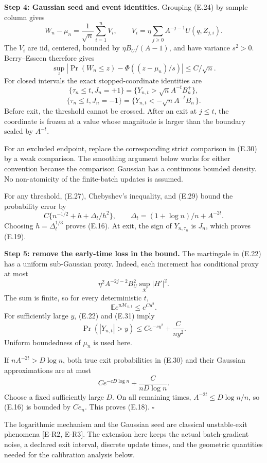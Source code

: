 \textbf{Step 4: Gaussian seed and event identities.} Grouping (E.24) by
sample column gives \[
W_n-\mu_n=\frac1{\sqrt n}\sum_{i=1}^n V_i,\qquad
V_i=\eta\sum_{j\ge0}A^{-j-1}U(q,Z_{j,i}).
\tag{E.28}
\] The \(V_i\) are iid, centered, bounded by \(\eta B_U/(A-1)\), and
have variance \(s^2>0\). Berry--Esseen therefore gives \[
\sup_z\left|
\Pr(W_n\le z)-\Phi((z-\mu_n)/s)
\right|\le C/\sqrt n.
\tag{E.29}
\] For closed intervals the exact stopped-coordinate identities are \[
\{\tau_n\le t,J_n=+1\}
=\{Y_{n,t}>\sqrt n A^{-t}B_n^+\},
\] \[
\{\tau_n\le t,J_n=-1\}
=\{Y_{n,t}<-\sqrt n A^{-t}B_n^-\}.
\tag{E.30}
\] Before exit, the threshold cannot be crossed. After an exit at
\(j\le t\), the coordinate is frozen at a value whose magnitude is
larger than the boundary scaled by \(A^{-t}\).

For an excluded endpoint, replace the corresponding strict comparison in
(E.30) by a weak comparison. The smoothing argument below works for
either convention because the comparison Gaussian has a continuous
bounded density. No non-atomicity of the finite-batch updates is
assumed.

For any threshold, (E.27), Chebyshev's inequality, and (E.29) bound the
probability error by \[
C\{n^{-1/2}+h+\Delta_t/h^2\},\qquad
\Delta_t=(1+\log n)/n+A^{-2t}.
\] Choosing \(h=\Delta_t^{1/3}\) proves (E.16). At exit, the sign of
\(Y_{n,\tau_n}\) is \(J_n\), which proves (E.19).

\textbf{Step 5: remove the early-time loss in the bound.} The martingale
in (E.22) has a uniform sub-Gaussian proxy. Indeed, each increment has
conditional proxy at most \[
\eta^2 A^{-2j-2}B_U^2\sup_{\mathcal K}|H'|^2.
\] The sum is finite, so for every deterministic \(t\), \[
\mathbb E e^{u\mathcal M_{n,t}}\le e^{C u^2}.
\tag{E.31}
\] For sufficiently large \(y\), (E.22) and (E.31) imply \[
\Pr(|Y_{n,t}|>y)\le C e^{-c y^2}+\frac{C}{ny^2}.
\tag{E.32}
\] Uniform boundedness of \(\mu_n\) is used here.

If \(nA^{-2t}>D\log n\), both true exit probabilities in (E.30) and
their Gaussian approximations are at most \[
C e^{-cD\log n}+\frac{C}{nD\log n}.
\] Choose a fixed sufficiently large \(D\). On all remaining times,
\(A^{-2t}\le D\log n/n\), so (E.16) is bounded by \(Ce_n\). This proves
(E.18). \(\square\)

The logarithmic mechanism and the Gaussian seed are classical
unstable-exit phenomena {[}E-R2, E-R3{]}. The extension here keeps the
actual batch-gradient noise, a declared exit interval, discrete update
times, and the geometric quantities needed for the calibration analysis
below.

